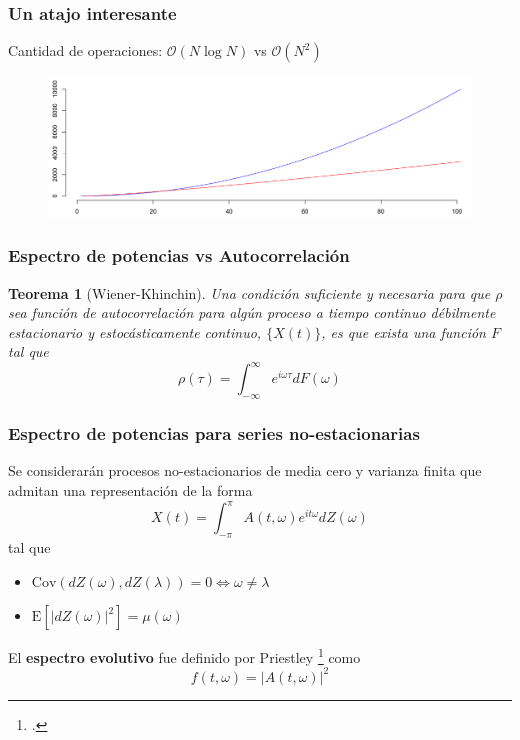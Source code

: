 \documentclass[11pt]{beamer}
\newtheorem{thrm}{Teorema}
\newcommand{\R}{\mathbb{R}}
\newcommand{\intR}{\int_{-\infty}^{\infty}}
\newcommand{\intPI}{\int_{-\pi}^{\pi}}
\newcommand{\E}[1]{\mathrm{E}\left[ #1 \right]}
\newcommand{\Cov}[1]{\mathrm{Cov}\left( #1 \right)}
\newcommand{\abso}[1]{\left| #1 \right|}
\begin{document}

\begin{frame}\frametitle{Un atajo interesante}
Cantidad de operaciones: $\mathcal{O}(N \log{}N)$ vs $\mathcal{O}(N^{2})$
\begin{figure}
\centering
\includegraphics[width=\linewidth]{./curso_scripts/N.png}
\end{figure}
\end{frame}


\begin{frame}\frametitle{Espectro de potencias vs Autocorrelación}
\begin{thrm}[Wiener-Khinchin]
Una condición suficiente y necesaria para que $\rho$ sea función de autocorrelación para 
algún proceso a tiempo continuo débilmente estacionario y estocásticamente continuo, 
$\{X(t)\}$,  es que exista una función $F$ tal que
\begin{equation*}
\rho(\tau) = \intR e^{i \omega \tau} dF(\omega)
\end{equation*}
\end{thrm}
\end{frame}


\begin{frame}\frametitle{Espectro de potencias para series no-estacionarias}
Se considerarán procesos no-estacionarios \alert{de media cero y varianza finita} que admitan una 
representación de la forma
\begin{equation*}
X(t) = \intPI A(t,\omega) e^{i t \omega} dZ(\omega)
\end{equation*}
tal que 
\begin{itemize}
\item $\Cov{dZ(\omega),dZ(\lambda)} = 0 \Leftrightarrow \omega \neq \lambda$
\item $\E{\abso{dZ(\omega)}^{2}} = \mu(\omega)$
\end{itemize}

El \textbf{espectro evolutivo} fue definido por Priestley \footcite{Priestley65} como
\begin{equation*}
f(t,\omega) = \abso{A(t,\omega)}^{2}
\end{equation*}
\end{frame}
\end{document}
